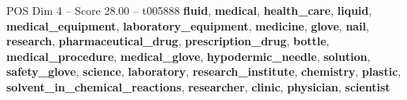\begin{textsample}{POS Dim 4 – Score 28.00 – t005888}  \label{ex:f4_pos_037}
\textbf{fluid}, \textbf{medical}, \textbf{health\_care}, \textbf{liquid}, \textbf{medical\_equipment}, \textbf{laboratory\_equipment}, \textbf{medicine}, \textbf{glove}, \textbf{nail}, \textbf{research}, \textbf{pharmaceutical\_drug}, \textbf{prescription\_drug}, \textbf{bottle}, \textbf{medical\_procedure}, \textbf{medical\_glove}, \textbf{hypodermic\_needle}, \textbf{solution}, \textbf{safety\_glove}, \textbf{science}, \textbf{laboratory}, \textbf{research\_institute}, \textbf{chemistry}, \textbf{plastic}, \textbf{solvent\_in\_chemical\_reactions}, \textbf{researcher}, \textbf{clinic}, \textbf{physician}, \textbf{scientist}

\end{textsample}
